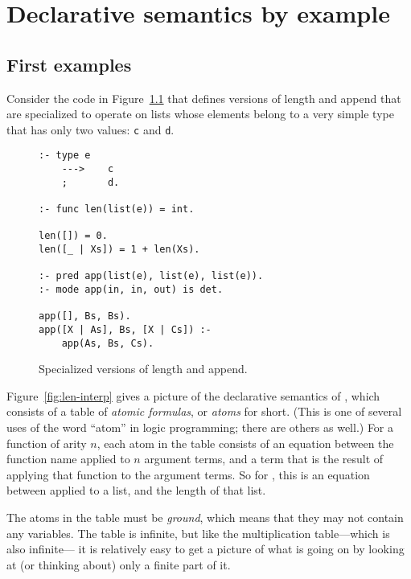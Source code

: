 \chapter{Declarative semantics by example}
\label{sec:by-example}

\section{First examples}
\label{sec:first-examples}

Consider the code in Figure~\ref{fig:len-app}
that defines versions of length and append
that are specialized to operate on lists
whose elements belong to a very simple type
that has only two values: \verb#c# and \verb#d#.

\begin{figure}[htb]
\begin{verbatim}
:- type e
    --->    c
    ;       d.

:- func len(list(e)) = int.

len([]) = 0.
len([_ | Xs]) = 1 + len(Xs).

:- pred app(list(e), list(e), list(e)).
:- mode app(in, in, out) is det.

app([], Bs, Bs).
app([X | As], Bs, [X | Cs]) :-
    app(As, Bs, Cs).
\end{verbatim}
\caption{Specialized versions of length and append.\label{fig:len-app}}
\end{figure}

Figure~\ref{fig:len-interp} gives a picture
of the declarative semantics of ,
which consists of a table of \emph{atomic formulas},
or \emph{atoms\label{gi:atom}} for short.
(This is one of several uses of the word ``atom'' in logic programming;
there are others as well.)
For a function of arity $n$, each atom in the table
consists of an equation between
the function name applied to $n$ argument terms,
and a term that is the result of
applying that function to the argument terms.
So for ,
this is an equation between  applied to a list,
and the length of that list.


The atoms in the table must be \emph{ground},
which means that they may not contain any variables.
The table is infinite,
but like the multiplication table---which is also infinite---%
it is relatively easy to get a picture of what is going on
by looking at (or thinking about) only a finite part of it.

